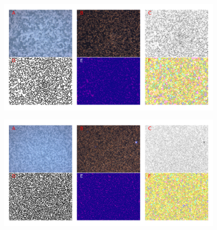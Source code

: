 \documentclass[12pt, titlepage]{article}
\begin{document}
	\begin{figure}[h]
		\centering
		\includegraphics[width=1.0\linewidth]{microstructure_30C.png}
		\caption{}
		\label{fig:micro_30C}
	\end{figure}

	\begin{figure}[h]
		\centering
		\includegraphics[width=1.0\linewidth]{microstructure_35C.png}
		\caption{}
		\label{fig:micro_25C}
	\end{figure}
\end{document}
